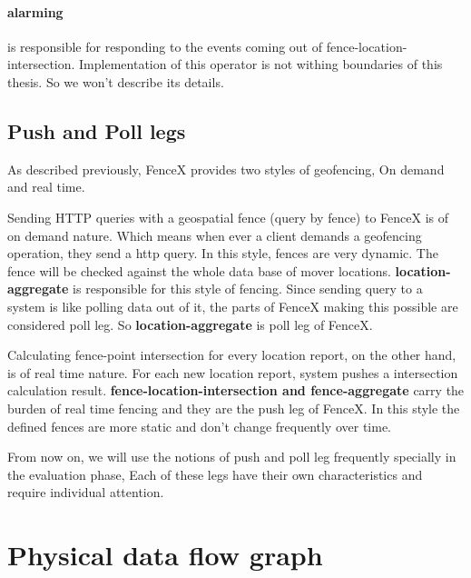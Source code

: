 \documentclass[a4]{report}
\begin{document}
    \paragraph{alarming} is responsible for responding to the events coming out of fence-location-intersection.
    Implementation of this operator is not withing boundaries of this thesis. So we won't describe its details.


    \subsection{Push and Poll legs}
    As described previously, FenceX provides two styles of geofencing, On demand and real time.

    Sending HTTP queries with a geospatial fence (query by fence) to FenceX is of on demand nature.
    Which means when ever a client demands a geofencing operation, they send a http query. In this style, fences are very dynamic.
    The fence will be checked against the whole data base of mover locations.
    \textbf{location-aggregate} is responsible for this style of fencing.
    Since sending query to a system is like polling data out of it, the parts of FenceX making this possible are considered poll leg.
    So \textbf{location-aggregate} is poll leg of FenceX.

    Calculating fence-point intersection for every location report, on the other hand, is of real time nature.
    For each new location report, system pushes a intersection calculation result.
    \textbf{fence-location-intersection and fence-aggregate} carry the burden of real time fencing and they are the push leg of FenceX.
    In this style the defined fences are more static and don't change frequently over time.

    From now on, we will use the notions of push and poll leg frequently specially in the evaluation phase, Each of these legs have their own characteristics and require individual attention.

    \section{Physical data flow graph}
\end{document}
